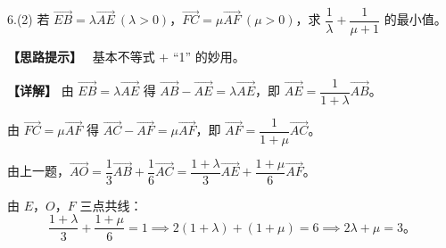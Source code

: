 \documentclass[UTF8,10pt,aspectratio=169]{ctexbeamer}
\begin{document}
	\begin{frame}
		6.(2) 若 $\overrightarrow{EB} = \lambda \overrightarrow{AE}\ (\lambda > 0)$，$\overrightarrow{FC} = \mu \overrightarrow{AF}\ (\mu > 0)$，求 $\dfrac{1}{\lambda} + \dfrac{1}{\mu + 1}$ 的最小值。
		
		\vspace{0.4cm}
		\textbf{【思路提示】} \ 基本不等式 $+$ “1” 的妙用。
		
		\pause
		\vspace{0.4cm}
		\textbf{【详解】} 由 $\overrightarrow{EB} = \lambda \overrightarrow{AE}$ 得 $\overrightarrow{AB} - \overrightarrow{AE} = \lambda \overrightarrow{AE}$，即 $\overrightarrow{AE} = \dfrac{1}{1+\lambda}\overrightarrow{AB}$。
		
		\vspace{0.1cm}
		由 $\overrightarrow{FC} = \mu \overrightarrow{AF}$ 得 $\overrightarrow{AC} - \overrightarrow{AF} = \mu \overrightarrow{AF}$，即 $\overrightarrow{AF} = \dfrac{1}{1+\mu}\overrightarrow{AC}$。
		
		\vspace{0.2cm}
		由上一题，$\overrightarrow{AO} = \dfrac{1}{3}\overrightarrow{AB} + \dfrac{1}{6}\overrightarrow{AC} = \dfrac{1+\lambda}{3}\overrightarrow{AE} + \dfrac{1+\mu}{6}\overrightarrow{AF}$。
		
		\vspace{0.2cm}
		由 $E$，$O$，$F$ 三点共线：
		$$\dfrac{1+\lambda}{3} + \dfrac{1+\mu}{6} = 1 \implies 2(1+\lambda) + (1+\mu) = 6 \implies 2\lambda + \mu = 3。$$
	\end{frame}
	
\end{document}
